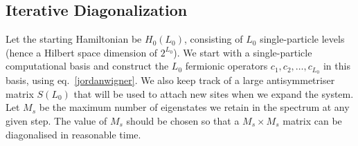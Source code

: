 
\subsection*{Iterative Diagonalization}
Let the starting Hamiltonian be \(H_0(L_0)\), consisting of \(L_0\) single-particle levels (hence a Hilbert space dimension of \(2^{L_0}\)). We start with a single-particle computational basis and construct the \(L_0\) fermionic operators \(c_1, c_2, \ldots, c_{L_0}\) in this basis, using eq.~\ref{jordanwigner}. We also keep track of a large antisymmetriser matrix \(S(L_0)\) that will be used to attach new sites when we expand the system. Let \(M_s\) be the maximum number of eigenstates we retain in the spectrum at any given step. The value of \(M_s\) should be chosen so that a \(M_s\times M_s\) matrix can be diagonalised in reasonable time.
